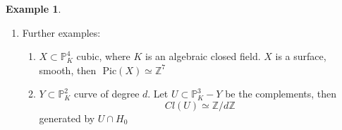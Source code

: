 \documentclass[11pt]{article}
\theoremstyle{definition}
\newtheorem{ex}[thm]{Example}
\newcommand{\pic}{\text{ Pic}}
\newcommand{\proj}{\mathbb P}
\newcommand{\intg}{\mathbb Z}
\renewcommand{\div}{\textnormal{div}}
\newcommand{\Lrta}{\Longrightarrow}
\newcommand{\lrta}{\longrightarrow}
\begin{document}
\begin{ex}
\begin{enumerate}[label=(\arabic*)]
\begin{proof}
\begin{enumerate}[label=(\alph*)]
$\Lrta$
$$
\begin{aligned}
\underline{deg}(\div(f))&=\sum n_i \underline{deg}(D_i-\sum m_j \underline{deg}(E_j)\\ 
&(\underline{deg}(D_i)=deg(h_i),\underline{deg}(E_j)=deg(k_j))\\
&=deg(g_1)-deg(g_2)=0.
\end{aligned}
$$
Then we come back to prove the \underline{Key fact}:
$$
f_1=\sum_{\underline{d}}\alpha_{\underline{d}} \left(\frac{X_0}{X_0}\right)^{d_0}\cdots \left(\frac{X_n}{X_0}\right)^{d_n}
$$
e.g.
$$
\begin{aligned}
&\left(\frac{X_1}{X_0}\right)^{2}+37 \left(\frac{X_1}{X_0}\right)^{3}\left(\frac{X_2}{X_0}\right)\\
&=\frac{X_0^2X_1^2+37X_1^3X_2}{X_0^4}\\
&=\frac{1}{X_0^{deg f_1}}\sum_{\underline{d}}\alpha_{\underline{d}} X_0^{deg f_1-\sum_{i=1}^n d_i} X_1^{}d_1\cdots X_n^{d_n}\\
&=\frac{\text{homogeneous degree $deg f_1$}}{X_0^{deg f_1}}\\
\end{aligned}
$$
$$
\Lrta f_2=\frac{\text{homogeneous degree $deg f_2$}}{X_0^{deg f_2}}\\
$$
$$
\Lrta \frac{f_1}{f_2}=\frac{X_0^{ deg f_1}(deg f_1)}{(deg f_2) X_0^{deg f_1}}
$$

\item $\underline{deg}: Cl(X)\lrta \intg$ is surjective because $\underline{deg}(D_0)=1$, $D_0$ associated to $X_0$ and injective because if $deg(D)=0$ write $D=D_1-D_2$ with $D_1,D_2$ effective then $\underline{deg}(D_1)=\underline{deg}(D_2)$. Write 
$D_1=\sum n_i E_i$, where $E_i$ is prime divisors associated to $h_i$. 
$D_2=\sum m_j F_j$, where $F_j$ is prime divisors associated to $k_j$. 


Then let $f=\prod h_i ^{n_i}\prod k_j^{- m_j}\in K(X)^\times$, and as shown above $dic(f)=D_1-D_2=D$ so $D$ is  $0$ in $Cl(X)$.
\item the proof can be found in Hartshorne
\end{enumerate}
\end{proof}
\item Further examples: 
\begin{enumerate}[label=(\alph*)]
\item $X\subset \proj^4_K$ cubic, where $K$ is an algebraic closed field. $X$ is a  surface, smooth, then $\pic(X)\simeq \intg^7$
\item $Y\subset \proj^2_K$ curve of degree $d$. Let $U\subset \proj^3_K-Y$ be the complements, then 
$$
Cl(U)\simeq \intg/d\intg
$$
generated by $U\cap H_0$
\end{enumerate}
\end{enumerate}
\end{ex}
\end{document}
